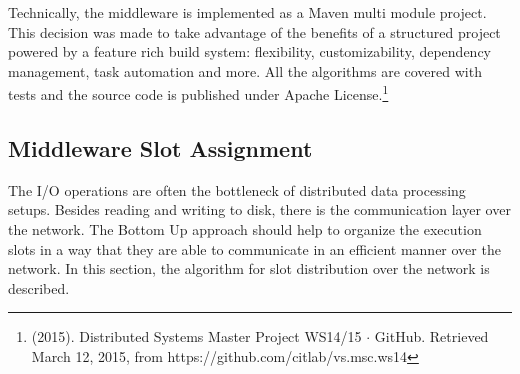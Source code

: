 Technically, the middleware is implemented as a Maven multi module project. This decision was made
to take advantage of the benefits of a structured project powered by a feature rich build system:
flexibility, customizability, dependency management, task automation and more. All the algorithms
are covered with tests and the source code is published under Apache License.\footnote{(2015).
Distributed Systems Master Project WS14/15 $\cdot$ GitHub. Retrieved March 12, 2015, from
https://github.com/citlab/vs.msc.ws14}

\subsection{Middleware Slot Assignment}
\label{sec:middleware_slot_assignment}
The I/O operations are often the bottleneck of distributed data processing setups. \cite{cheating}
Besides reading and writing to disk, there is the communication layer over the network. The Bottom
Up approach should help to organize the execution slots in a way that they are able to communicate
in an efficient manner over the network. In this section, the algorithm for  slot distribution over
the network is described.

